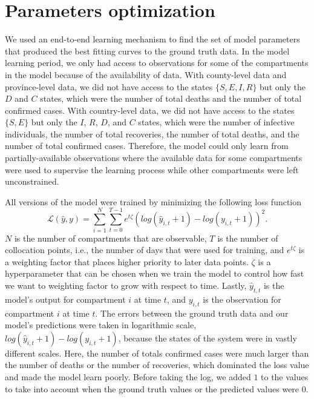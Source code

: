\section{Parameters optimization}
\label{sec:methodologies-parameters-optimization}

We used an end-to-end learning mechanism to find the set of model parameters that produced the best fitting curves to the ground truth data.
In the model learning period, we only had access to observations for some of the compartments in the model because of the availability of data.
With county-level data and province-level data, we did not have access to the states $\{S, E, I, R\}$ but only the $D$ and $C$ states, which were the number of total deaths and the number of total confirmed cases.
With country-level data, we did not have access to the states $\{S, E\}$ but only the $I$, $R$, $D$, and $C$ states, which were the number of infective individuals, the number of total recoveries, the number of total deaths, and the number of total confirmed cases.
Therefore, the model could only learn from partially-available observations where the available data for some compartments were used to supervise the learning process while other compartments were left unconstrained.

All versions of the model were trained by minimizing the following loss function
\begin{equation}
    \mathcal{L}(\hat{y}, y) = \sum_{i=1}^N \sum_{t=0}^{T-1} e^{t\zeta} (log(\hat{y}_{i,t} + 1) - log(y_{i,t} + 1))^2.
    \label{eq:ude-model-loss}
\end{equation}
$N$ is the number of compartments that are observable, $T$ is the number of collocation points, i.e., the number of days that were used for training, and $e^{t\zeta}$ is a weighting factor that places higher priority to later data points.
$\zeta$ is a hyperparameter that can be chosen when we train the model to control how fast we want to weighting factor to grow with respect to time.
Lastly, $\hat{y}_{t,t}$ is the model's output for compartment $i$ at time $t$, and $y_{i,t}$ is the observation for compartment $i$ at time $t$.
The errors between the ground truth data and our model's predictions were taken in logarithmic scale, $log(\hat{y}_{i,t} + 1) - log(y_{i,t} + 1)$, because the states of the system were in vastly different scales.
Here, the number of totals confirmed cases were much larger than the number of deaths or the number of recoveries, which dominated the loss value and made the model learn poorly.
Before taking the log, we added $1$ to the values to take into account when the ground truth values or the predicted values were $0$.


